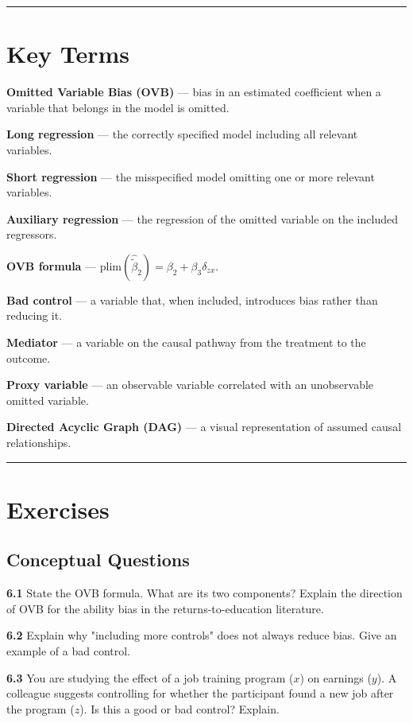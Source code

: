 \medskip\hrule\medskip

\section{Key Terms}

\textbf{Omitted Variable Bias (OVB)} --- bias in an estimated coefficient when a variable that belongs in the model is omitted.

\textbf{Long regression} --- the correctly specified model including all relevant variables.

\textbf{Short regression} --- the misspecified model omitting one or more relevant variables.

\textbf{Auxiliary regression} --- the regression of the omitted variable on the included regressors.

\textbf{OVB formula} --- $\text{plim}(\hat{\tilde{\beta}}_2) = \beta_2 + \beta_3 \delta_{zx}$.

\textbf{Bad control} --- a variable that, when included, introduces bias rather than reducing it.

\textbf{Mediator} --- a variable on the causal pathway from the treatment to the outcome.

\textbf{Proxy variable} --- an observable variable correlated with an unobservable omitted variable.

\textbf{Directed Acyclic Graph (DAG)} --- a visual representation of assumed causal relationships.

\medskip\hrule\medskip

\section{Exercises}

\subsection{Conceptual Questions}

\textbf{6.1} State the OVB formula. What are its two components? Explain the direction of OVB for the ability bias in the returns-to-education literature.

\textbf{6.2} Explain why "including more controls" does not always reduce bias. Give an example of a bad control.

\textbf{6.3} You are studying the effect of a job training program ($x$) on earnings ($y$). A colleague suggests controlling for whether the participant found a new job after the program ($z$). Is this a good or bad control? Explain.

